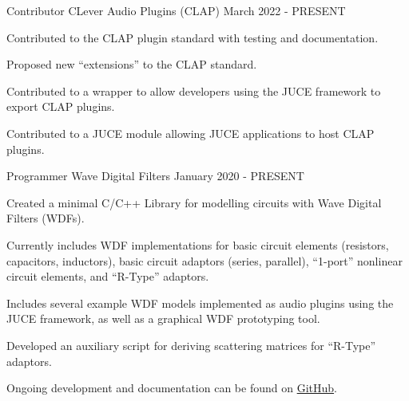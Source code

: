 \begin{cventries}
  \cventry
    {Contributor} %
    {CLever Audio Plugins (CLAP)} %
    {} %
    {March 2022 - PRESENT} %
    {
      \begin{cvitems} %
        \item {Contributed to the CLAP plugin standard with testing and documentation.}
        \item {Proposed new ``extensions'' to the CLAP standard.}
        \item {Contributed to a wrapper to allow developers using the JUCE framework to export CLAP plugins.}
        \item {Contributed to a JUCE module allowing JUCE applications to host CLAP plugins.}
      \end{cvitems}
    }


  \cventry
    {Programmer} %
    {Wave Digital Filters} %
    {} %
    {January 2020 - PRESENT} %
    {
      \begin{cvitems} %
        \item {Created a minimal C/C++ Library for modelling circuits with Wave Digital Filters (WDFs).}
        \item {Currently includes WDF implementations for basic circuit elements (resistors, capacitors, inductors),
               basic circuit adaptors (series, parallel), ``1-port'' nonlinear circuit elements, and ``R-Type'' adaptors.}
        \item {Includes several example WDF models implemented as audio plugins using the JUCE framework,
               as well as a graphical WDF prototyping tool.}
        \item {Developed an auxiliary script for deriving scattering matrices for ``R-Type'' adaptors.}
        \item {Ongoing development and documentation can be found on \href{https://github.com/jatinchowdhury18/WaveDigitalFilters}{GitHub}.}
      \end{cvitems}
    }



\end{cventries}
